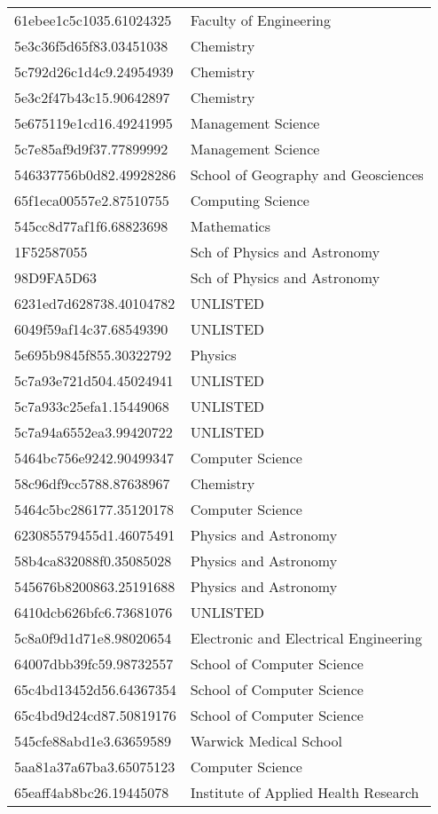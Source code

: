 \begin{tabular}{ll}
61ebee1c5c1035.61024325 & Faculty of Engineering \\
5e3c36f5d65f83.03451038 & Chemistry \\
5c792d26c1d4c9.24954939 & Chemistry \\
5e3c2f47b43c15.90642897 & Chemistry \\
5e675119e1cd16.49241995 & Management Science \\
5c7e85af9d9f37.77899992 & Management Science \\
546337756b0d82.49928286 & School of Geography and Geosciences \\
65f1eca00557e2.87510755 & Computing Science \\
545cc8d77af1f6.68823698 & Mathematics \\
1F52587055 & Sch of Physics and Astronomy \\
98D9FA5D63 & Sch of Physics and Astronomy \\
6231ed7d628738.40104782 & UNLISTED \\
6049f59af14c37.68549390 & UNLISTED \\
5e695b9845f855.30322792 & Physics \\
5c7a93e721d504.45024941 & UNLISTED \\
5c7a933c25efa1.15449068 & UNLISTED \\
5c7a94a6552ea3.99420722 & UNLISTED \\
5464bc756e9242.90499347 & Computer Science \\
58c96df9cc5788.87638967 & Chemistry \\
5464c5bc286177.35120178 & Computer Science \\
623085579455d1.46075491 & Physics and Astronomy \\
58b4ca832088f0.35085028 & Physics and Astronomy \\
545676b8200863.25191688 & Physics and Astronomy \\
6410dcb626bfc6.73681076 & UNLISTED \\
5c8a0f9d1d71e8.98020654 & Electronic and Electrical Engineering \\
64007dbb39fc59.98732557 & School of Computer Science \\
65c4bd13452d56.64367354 & School of Computer Science \\
65c4bd9d24cd87.50819176 & School of Computer Science \\
545cfe88abd1e3.63659589 & Warwick Medical School \\
5aa81a37a67ba3.65075123 & Computer Science \\
65eaff4ab8bc26.19445078 & Institute of Applied Health Research \\

\end{tabular}
